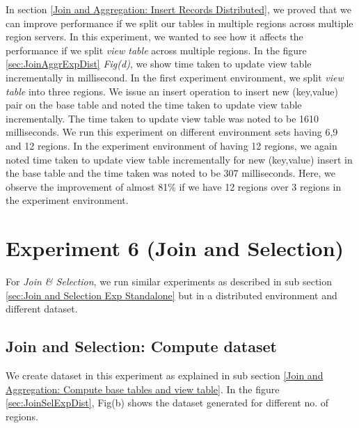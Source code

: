 \documentclass[11pt,a4paper,bibtotoc,idxtotoc,headsepline,footsepline,footexclude,BCOR12mm,DIV13]{scrbook}
\begin{document}
In section \ref{Join and Aggregation: Insert Records Distributed},  we proved that we can improve performance if we split our tables in multiple regions across multiple region servers. In this experiment, we wanted to see how it affects the performance if we split \emph{view table} across multiple regions. In the figure \ref{sec:JoinAggrExpDist} \emph{Fig(d)}, we show time taken to update view table incrementally in millisecond. In the first experiment environment, we split \emph{view table} into three regions. We issue an insert operation to insert new (key,value) pair on the base table and noted the time taken to update view table incrementally. The time taken to update view table was noted to be 1610 milliseconds. We run this experiment on different environment sets having 6,9 and 12 regions. In the experiment environment of having 12 regions, we again noted time taken to update view table incrementally for new (key,value) insert in the base table and the time taken was noted to be 307 milliseconds. Here, we observe the improvement of almost 81\% if we have 12 regions over 3 regions in the experiment environment.


\section{Experiment 6 (Join and Selection)}
\label{sec:Join and Selection Exp Distributed} 

For \emph{Join \& Selection}, we run similar experiments as described in sub section \ref{sec:Join and Selection Exp Standalone} but in a distributed environment and different dataset.

\subsection{Join and Selection: Compute dataset}
\label{Join and Selection: Compute base tables and view table}

We create dataset in this experiment as explained in sub section \ref{Join and Aggregation: Compute base tables and view table}. In the figure \ref{sec:JoinSelExpDist}, Fig(b) shows the dataset generated for different no. of regions.
\end{document}
